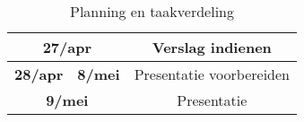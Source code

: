 \begin{table}[H]
{\begin{tabular}{@{}|c|c|c|c|@{}}
			\multicolumn{2}{|c|}{\textbf{27/apr}}                            & \multicolumn{2}{c|}{Verslag indienen}                                                                \\ \midrule
			\textbf{28/apr}                 & \textbf{8/mei}                 & \multicolumn{2}{c|}{Presentatie voorbereiden}                                                        \\ \midrule
			\multicolumn{2}{|c|}{\textbf{9/mei}}                             & \multicolumn{2}{c|}{Presentatie}                                                                     \\ \bottomrule
		\end{tabular}%
	}
	\caption{Planning en taakverdeling}
	\label{table:planning}
\end{table}